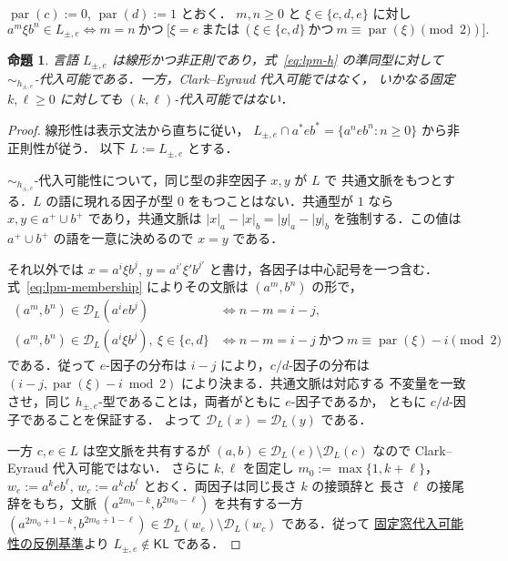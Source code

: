 \documentclass[11pt,a4paper]{ltjsarticle}
\newtheorem{proposition}[theorem]{命題}
\theoremstyle{remark}
\theoremstyle{plain}
\newcommand{\D}{\mathcal{D}}
\begin{document}
$\operatorname{par}(c):=0$, $\operatorname{par}(d):=1$ とおく．
$m,n\ge0$ と $\xi\in\{c,d,e\}$ に対し
\begin{equation}\label{eq:lpm-membership}
a^m\xi b^n\in L_{\pm,e}
\iff
m=n
\ \text{かつ}\
\bigl[
 \xi=e
 \ \text{または}\
 (\xi\in\{c,d\}
  \ \text{かつ}\
  m\equiv\operatorname{par}(\xi)\pmod2)
\bigr].
\end{equation}

\begin{proposition}\label{prop:linear-separator-example}
言語 $L_{\pm,e}$ は線形かつ非正則であり，式~\eqref{eq:lpm-h} の準同型に対して
$\sim_{h_{\pm,e}}$-代入可能である．一方，Clark--Eyraud 代入可能ではなく，
いかなる固定 $k,\ell\ge0$ に対しても $(k,\ell)$-代入可能ではない．
\end{proposition}

\begin{proof}
線形性は表示文法から直ちに従い，
$L_{\pm,e}\cap a^*eb^*=\{a^neb^n:n\ge0\}$ から非正則性が従う．
以下 $L:=L_{\pm,e}$ とする．

$\sim_{h_{\pm,e}}$-代入可能性について，同じ型の非空因子 $x,y$ が $L$ で
共通文脈をもつとする．$L$ の語に現れる因子が型 $0$ をもつことはない．共通型が
$1$ なら $x,y\in a^+\cup b^+$ であり，共通文脈は
$|x|_a-|x|_b=|y|_a-|y|_b$ を強制する．この値は
$a^+\cup b^+$ の語を一意に決めるので $x=y$ である．

それ以外では
$x=a^i\xi b^j$, $y=a^{i'}\xi'b^{j'}$ と書け，各因子は中心記号を一つ含む．
式~\eqref{eq:lpm-membership} によりその文脈は $(a^m,b^n)$ の形で，
\[
\begin{array}{ll}
(a^m,b^n)\in\D_L(a^ieb^j)
 &\Longleftrightarrow n-m=i-j,\\
(a^m,b^n)\in\D_L(a^i\xi b^j),\ \xi\in\{c,d\}
 &\Longleftrightarrow
 n-m=i-j\ \text{かつ}\
 m\equiv\operatorname{par}(\xi)-i\pmod2
\end{array}
\]
である．従って $e$-因子の分布は $i-j$ により，$c/d$-因子の分布は
$(i-j,\operatorname{par}(\xi)-i\bmod2)$ により決まる．共通文脈は対応する
不変量を一致させ，同じ $h_{\pm,e}$-型であることは，両者がともに $e$-因子であるか，
ともに $c/d$-因子であることを保証する．
よって $\D_L(x)=\D_L(y)$ である．

一方 $c,e\in L$ は空文脈を共有するが
$(a,b)\in\D_L(e)\setminus\D_L(c)$ なので Clark--Eyraud 代入可能ではない．
さらに $k,\ell$ を固定し $m_0:=\max\{1,k+\ell\}$，
$w_e:=a^keb^\ell$, $w_c:=a^kcb^\ell$ とおく．両因子は同じ長さ $k$ の接頭辞と
長さ $\ell$ の接尾辞をもち，文脈 $(a^{2m_0-k},b^{2m_0-\ell})$ を共有する一方
$(a^{2m_0+1-k},b^{2m_0+1-\ell}) \in\D_L(w_e)\setminus\D_L(w_c)$
である．従って \hyperref[crit:kl]{固定窓代入可能性の反例基準}より
$L_{\pm,e}\notin\mathsf{KL}$ である．
\end{proof}
\end{document}
